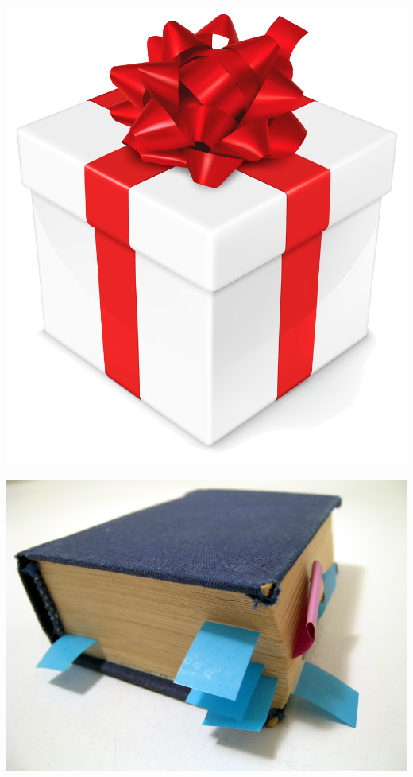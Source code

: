 \documentclass[17pt]{beamer}
\begin{document}
\begin{frame}
\centering
\includegraphics[height=\paperheight]{gift} 
\end{frame}

\begin{frame}
\hspace*{-11.2mm}
\includegraphics[width=\paperwidth]{bookmark}
\end{frame}
\end{document}
